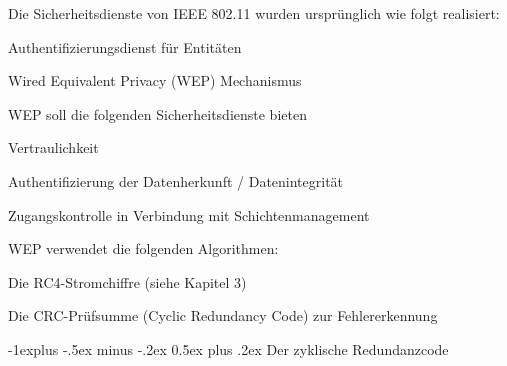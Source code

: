 \documentclass[a4paper]{article}
\makeatletter
\renewcommand{\subsection}{\@startsection{subsection}{2}{0mm}%
 {-1explus -.5ex minus -.2ex}%
 {0.5ex plus .2ex}%
 {\normalfont\normalsize\bfseries}}
\makeatother
\begin{document}
\begin{multicols}{3}
      \begin{itemize*}
            \item Die Sicherheitsdienste von IEEE 802.11 wurden ursprünglich wie folgt
            realisiert:
            \begin{itemize*}
                  \item Authentifizierungsdienst für Entitäten
                  \item Wired Equivalent Privacy (WEP) Mechanismus
            \end{itemize*}
            \item WEP soll die folgenden Sicherheitsdienste bieten
            \begin{itemize*}
                  \item Vertraulichkeit
                  \item Authentifizierung der Datenherkunft / Datenintegrität
                  \item Zugangskontrolle in Verbindung mit Schichtenmanagement
            \end{itemize*}
            \item WEP verwendet die folgenden Algorithmen:
            \begin{itemize*}
                  \item Die RC4-Stromchiffre (siehe Kapitel 3)
                  \item Die CRC-Prüfsumme (Cyclic Redundancy Code) zur Fehlererkennung
            \end{itemize*}
      \end{itemize*}


      \subsection{Der zyklische
            Redundanzcode}


\end{multicols}
\end{document}
